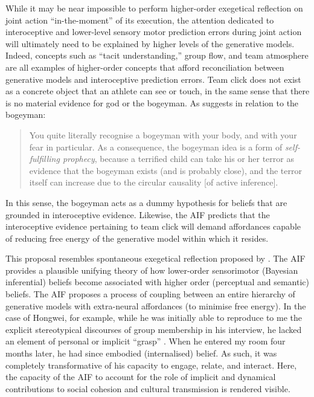 \begin{CJK}{UTF8}{gbsn}

While it may be near impossible to perform higher-order exegetical reflection on joint action ``in-the-moment'' of its execution, the attention dedicated to interoceptive and lower-level sensory motor prediction errors during joint action will ultimately need to be explained by higher levels of the generative models. Indeed, concepts such as ``tacit understanding,'' group flow, and team atmosphere are all examples of higher-order concepts that afford reconciliation between generative models and interoceptive prediction errors.  Team click does not exist as a concrete object that an athlete can see or touch, in the same sense that there is no material evidence for god or the bogeyman.  As \citep[909]{Pezzulo2014} suggests in relation to the bogeyman:

    \begin{quote}
      You quite literally recognise a bogeyman with your body, and with your fear in particular.  As a consequence, the bogeyman idea is a form of \textit{self-fulfilling prophecy}, because a terrified child can take his or her terror as evidence that the bogeyman exists (and is probably close), and the terror itself can increase due to the circular causality [of active inference].
    \end{quote}

In this sense, the bogeyman acts as a dummy hypothesis for beliefs that are grounded in interoceptive evidence.  Likewise, the AIF predicts that the interoceptive evidence pertaining to team click will demand affordances capable of reducing free energy of the generative model within which it resides.

This proposal resembles spontaneous exegetical reflection proposed by \textcite{Boyer2006}. The AIF provides a plausible unifying theory of how lower-order sensorimotor (Bayesian inferential) beliefs become associated with higher order (perceptual and semantic) beliefs.  The AIF proposes a process of coupling between an entire hierarchy of generative models with extra-neural affordances (to minimise free energy).  In the case of Hongwei, for example, while he was initially able to reproduce to me the explicit stereotypical discourses of group membership in his interview, he lacked an element of personal or implicit ``grasp'' \citep{Yufik2013}.  When he entered my room four months later, he had since embodied (internalised) belief. As such, it was completely transformative of his capacity to engage, relate, and interact. Here, the capacity of the AIF to account for the role of implicit and dynamical contributions to social cohesion and cultural transmission is rendered visible.









\end{CJK}
